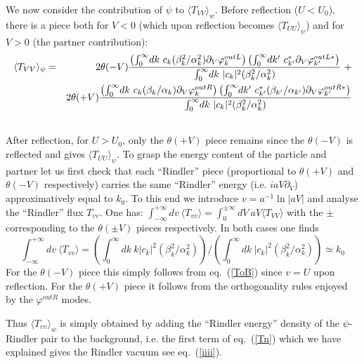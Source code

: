 \documentclass[12pt,oneside]{report}
\def\p {\prime}
\begin{document}
We now consider the contribution of $\psi$ to $\langle T_{VV}\rangle_{w} $.
Before reflection ($U<U_0$),
there is a piece both for $V<0$ (which upon reflection becomes 
$\langle T_{UU}\rangle_{\psi}$) and for $V>0$ (the partner contribution):
\begin{eqnarray}
\langle T_{VV}\rangle_{\psi} &=&2\theta(-V){
\left(\int_0^\infty \! dk\ 
c_k ( \beta_k^2/ \alpha_k^2) \partial_V \varphi^{out  L}_k\right)\left(
\int_0^\infty \! dk^\p\ 
c_{k^\p}^* 
\partial_V \varphi^{out L *}_{k^\p}\right)
\over 
\int_0^\infty \! dk\ 
\vert c_k \vert^2( \beta_k^2/ \alpha_k^2)
} \ +\nonumber\\
&\ & 2 \theta(+V){\left(
\int_0^\infty \! dk\ 
c_k( \beta_k/ \alpha_k)\partial_V \varphi^{out  R}_k\right)\left(
\int_0^\infty \! dk^\p\ 
c_{k^\p}^* ( \beta_{k^\p}/ \alpha_{k^\p})
\partial_V \varphi^{out R *}_{k^\p}\right)
\over 
\int_0^\infty \! dk\ 
\vert c_k \vert^2 ( \beta_k^2/ \alpha_k^2)
}\nonumber\\
&&\label{Tp}
\end{eqnarray}
After reflection, for $U>U_0$, only the $\theta(+V)$ piece remains
since the $\theta(-V)$ is reflected and gives $\langle T_{UU}\rangle_{\psi}$.
To grasp the energy content of the particle and partner let
us first check that each ``Rindler'' piece (proportional to
$\theta(+V)$ and $\theta(-V)$ respectively) carries the same
``Rindler'' energy (i.e. $i aV\partial_V$) 
approximatively equal to $k_0$.
To this
end we introduce $v=a^{-1}\ln \vert a V \vert$ and 
analyse the ``Rindler'' flux $T_{vv}$.  
One has: $\int_{-\infty}^{+\infty}\! dv \  \langle T_{vv} \rangle =
\int_0^{\pm \infty}\! dV \ aV
\langle T_{VV} \rangle$ with the $\pm$ corresponding to the
$\theta(\pm V)$ pieces respectively. In both cases one finds
\begin{equation}
\int_{-\infty}^{+\infty}\! dv \  \langle T_{vv} \rangle =
\left(\int_0^\infty\!dk\ k \vert c_k
\vert^2 ( \beta_k^2/ \alpha_k^2)\right)/\left(
\int_0^\infty\!dk\ \vert c_k
\vert^2 ( \beta_k^2/ \alpha_k^2) \right)\simeq k_0
\label{Tq}
\end{equation}
For the  $\theta(-V)$ piece this simply follows from
eq.~(\ref{ToB}) since $v=U$ upon reflection.
For the  $\theta(+V)$ piece it follows from the orthogonality
rules enjoyed by the $\varphi^{out R}$ modes.

Thus $\langle T_{vv}\rangle_w$ is 
simply obtained by adding the ``Rindler energy''
density of the $\psi$-Rindler 
pair to the background, i.e. the first term of eq.~(\ref{Tn})
 which we have explained gives the
Rindler vacuum see eq.~(\ref{iiii}).
 
\end{document}
